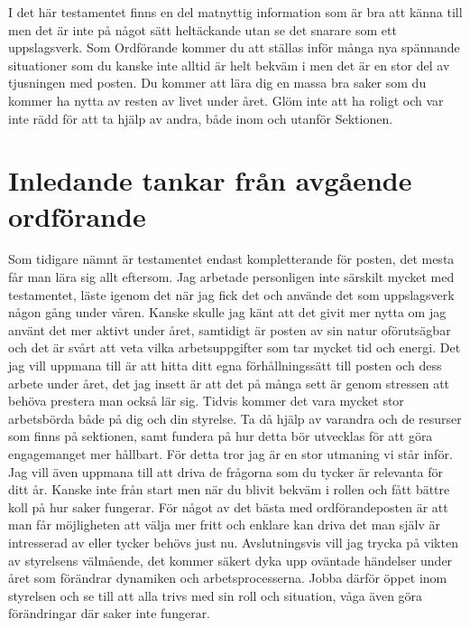 \documentclass[10pt]{article}
\begin{document}
    \heading{\doctitle}
    
    I det här testamentet finns en del matnyttig information som är bra att känna till men det är inte på något sätt heltäckande utan se det snarare som ett uppslagsverk. Som Ordförande kommer du att ställas inför många nya spännande situationer som du kanske inte alltid är helt bekväm i men det är en stor del av tjusningen med posten. Du kommer att lära dig en massa bra saker som du kommer ha nytta av resten av livet under året. Glöm inte att ha roligt och var inte rädd för att ta hjälp av andra, både inom och utanför Sektionen.
    
    \newpage
    
    \tableofcontents
    \newpage
    

    \section{Inledande tankar från avgående ordförande}

    Som tidigare nämnt är testamentet endast kompletterande för posten, det mesta får man lära sig allt eftersom. Jag arbetade personligen inte särskilt mycket med testamentet, läste igenom det när jag fick det och använde det som uppslagsverk någon gång under våren. Kanske skulle jag känt att det givit mer nytta om jag använt det mer aktivt under året, samtidigt är posten av sin natur oförutsägbar och det är svårt att veta vilka arbetsuppgifter som tar mycket tid och energi. Det jag vill uppmana till är att hitta ditt egna förhållningssätt till posten och dess arbete under året, det jag insett är att det på många sett är genom stressen att behöva prestera man också lär sig. Tidvis kommer det vara mycket stor arbetsbörda både på dig och din styrelse. Ta då hjälp av varandra och de resurser som finns på sektionen, samt fundera på hur detta bör utvecklas för att göra engagemanget mer hållbart. För detta tror jag är en stor utmaning vi står inför. Jag vill även uppmana till att driva de frågorna som du tycker är relevanta för ditt år. Kanske inte från start men när du blivit bekväm i rollen och fått bättre koll på hur saker fungerar. För något av det bästa med ordförandeposten är att man får möjligheten att välja mer fritt och enklare kan driva det man själv är intresserad av eller tycker behövs just nu. Avslutningsvis vill jag trycka på vikten av styrelsens välmående, det kommer säkert dyka upp oväntade händelser under året som förändrar dynamiken och arbetsprocesserna. Jobba därför öppet inom styrelsen och se till att alla trivs med sin roll och situation, våga även göra förändringar där saker inte fungerar. 
\end{document}
